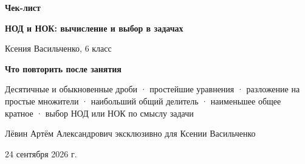 \documentclass[a4paper,12pt]{article}
\newcommand{\lessondate}{24 сентября 2026 г.}
\begin{document}

\thispagestyle{empty}
\begin{titlepage}
\centering
\vspace*{27mm}

{\Large\color{darkaccent}\bfseries Чек-лист\par}
\vspace{4mm}

{\huge\bfseries
НОД и НОК: вычисление и выбор в задачах\par}

\vspace{10mm}

{\large Ксения Васильченко, 6 класс\par}

\vfill

{\large\bfseries Что повторить после занятия\par}
\vspace{4mm}

\begin{minipage}{0.80\textwidth}
\centering
Десятичные и обыкновенные дроби · простейшие уравнения ·
разложение на простые множители · наибольший общий делитель ·
наименьшее общее кратное · выбор НОД или НОК по смыслу задачи
\end{minipage}

\vfill

{\normalsize
Лёвин Артём Александрович эксклюзивно для Ксении Васильченко\par}
\vspace{2mm}
{\normalsize \lessondate\par}

\vspace{18mm}


\end{titlepage}

\end{document}
